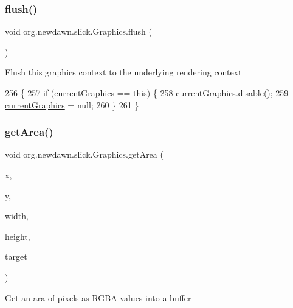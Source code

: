 \subsubsection{\texorpdfstring{flush()}{flush()}}
{\footnotesize\ttfamily void org.\+newdawn.\+slick.\+Graphics.\+flush (\begin{DoxyParamCaption}{ }\end{DoxyParamCaption})\hspace{0.3cm}{\ttfamily [inline]}}

Flush this graphics context to the underlying rendering context 
\begin{DoxyCode}
256                         \{
257         \textcolor{keywordflow}{if} (\mbox{\hyperlink{classorg_1_1newdawn_1_1slick_1_1_graphics_aededc15e0b8a4b7f0b9b6dc9ba263251}{currentGraphics}} == \textcolor{keyword}{this}) \{
258             \mbox{\hyperlink{classorg_1_1newdawn_1_1slick_1_1_graphics_aededc15e0b8a4b7f0b9b6dc9ba263251}{currentGraphics}}.\mbox{\hyperlink{classorg_1_1newdawn_1_1slick_1_1_graphics_a7979c584c48fc28175289e0012d5c943}{disable}}();
259             \mbox{\hyperlink{classorg_1_1newdawn_1_1slick_1_1_graphics_aededc15e0b8a4b7f0b9b6dc9ba263251}{currentGraphics}} = null;
260         \}
261     \}
\end{DoxyCode}
\mbox{\label{classorg_1_1newdawn_1_1slick_1_1_graphics_a6806d7350fea925c4b2282fd319f732f}} 
\subsubsection{\texorpdfstring{get\+Area()}{getArea()}}
{\footnotesize\ttfamily void org.\+newdawn.\+slick.\+Graphics.\+get\+Area (\begin{DoxyParamCaption}\item[{int}]{x,  }\item[{int}]{y,  }\item[{int}]{width,  }\item[{int}]{height,  }\item[{Byte\+Buffer}]{target }\end{DoxyParamCaption})\hspace{0.3cm}{\ttfamily [inline]}}

Get an ara of pixels as R\+G\+BA values into a buffer


